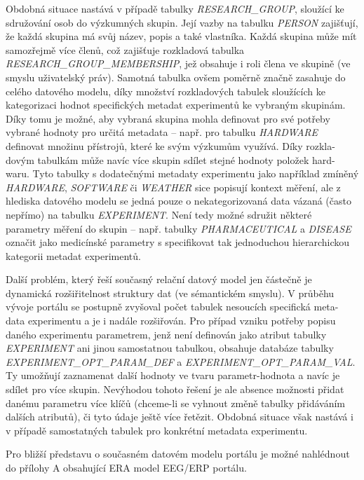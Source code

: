 \documentclass{projekt}
\begin{document}
Obdobná situace nastává v případě tabulky {\it RESEARCH\_GROUP}, sloužící ke sdružování osob do výzkumných skupin. Její vazby na tabulku {\it PERSON} zajišťují, že každá skupina má svůj název, popis a také vlastníka. Každá skupina může mít samozřejmě více členů, což zajišťuje rozkladová tabulka {\it RESEARCH\_GROUP\_MEMBERSHIP}, jež obsahuje i roli člena ve skupině (ve smyslu uživatelský práv). Samotná tabulka ovšem poměrně značně zasahuje do celého datového modelu, díky množství rozkladových tabulek sloužících ke kategorizaci hodnot specifických metadat experimentů ke vybraným skupinám. Díky tomu je možné, aby vybraná skupina mohla definovat pro své potřeby vybrané hodnoty pro určitá metadata – např. pro tabulku {\it HARDWARE} definovat množinu přístrojů, které ke svým výzkumům využívá. Díky rozkla-\\dovým tabulkám může navíc více skupin sdílet stejné hodnoty položek hard-\\waru. Tyto tabulky s dodatečnými metadaty experimentu jako například zmíněný {\it HARDWARE}, {\it SOFTWARE} či {\it WEATHER} sice popisují kontext měření, ale z hlediska datového modelu se jedná pouze o nekategorizovaná data vázaná (často nepřímo) na tabulku {\it EXPERIMENT}. Není tedy možné sdružit některé parametry měření do skupin – např. tabulky {\it PHARMACEUTICAL} a {\it DISEASE} označit jako medicínské parametry s specifikovat tak jednoduchou hierarchickou kategorii metadat experimentů.

Další problém, který řeší současný relační datový model jen částečně je dynamická rozšiřitelnost struktury dat (ve sémantickém smyslu). V průběhu vývoje portálu se postupně zvyšoval počet tabulek nesoucích specifická meta-\\data experimentu a je i nadále rozšiřován. Pro případ vzniku potřeby popisu daného experimentu parametrem, jenž není definován jako atribut tabulky {\it EXPERIMENT} ani jinou samostatnou tabulkou, obsahuje databáze tabulky {\it EXPERIMENT\_OPT\_PARAM\_DEF} a {\it EXPERIMENT\_OPT\_PARAM\_VAL}. Ty umožňují zaznamenat další hodnoty ve tvaru parametr-hodnota a navíc je sdílet pro více skupin. Nevýhodou tohoto řešení je ale absence možnosti přidat danému parametru více klíčů (chceme-li se vyhnout změně tabulky přidáváním dalších atributů), či tyto údaje ještě více řetězit. Obdobná situace však nastává i v případě samostatných tabulek pro konkrétní metadata experimentu. 

Pro bližší představu o současném datovém modelu portálu je možné nahlédnout do přílohy A obsahující ERA model EEG/ERP portálu.
\end{document}
